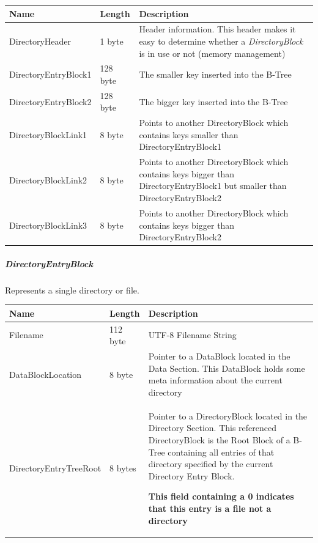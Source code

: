 \begin{tabular}{|l|l|p{5cm}|}
\hline
  \textbf{Name} & \textbf{Length} & \textbf{Description}
\\  \hline

DirectoryHeader & 1 byte & Header information. This header makes it easy to
determine whether a \textit{DirectoryBlock} is in use or not (memory
management)

\\  \hline

DirectoryEntryBlock1 & 128 byte & The smaller key inserted into the
B-Tree

\\  \hline

DirectoryEntryBlock2 & 128 byte & The bigger key inserted into the B-Tree

\\  \hline

DirectoryBlockLink1 & 8 byte & Points to another DirectoryBlock which contains
keys smaller than DirectoryEntryBlock1

\\  \hline

DirectoryBlockLink2 & 8 byte & Points to another DirectoryBlock which contains
keys bigger than DirectoryEntryBlock1 but smaller than DirectoryEntryBlock2

\\  \hline

DirectoryBlockLink3 & 8 byte & Points to another DirectoryBlock which contains
keys bigger than DirectoryEntryBlock2

\\  \hline


\end{tabular}

\subparagraph*{DirectoryEntryBlock}

Represents a single directory or file.

\begin{tabular}{|l|l|p{5cm}|}
\hline
  \textbf{Name} & \textbf{Length} & \textbf{Description}
\\  \hline

Filename & 112 byte & UTF-8 Filename String 


\\  \hline

DataBlockLocation & 8 byte & Pointer to a DataBlock located in the Data Section.
This DataBlock holds some meta information about the current directory


\\  \hline

DirectoryEntryTreeRoot & 8 bytes & Pointer to a DirectoryBlock located in the
Directory Section. This referenced DirectoryBlock is the Root Block of a B-Tree
containing all entries of that directory specified by the current Directory Entry Block.
\newline

\textbf{This field containing a 0 indicates that this entry is a file not a directory}



\\  \hline

\end{tabular}


